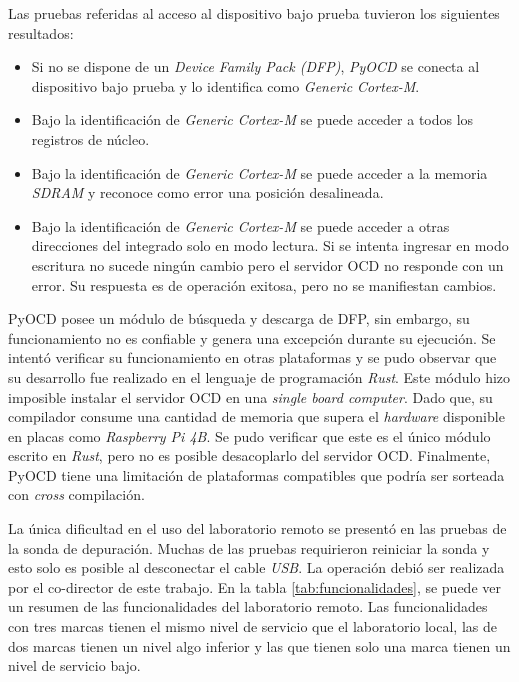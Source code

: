 Las pruebas referidas al acceso al dispositivo bajo prueba tuvieron los siguientes resultados:

\begin{itemize}
    \item Si no se dispone de un \emph{Device Family Pack (DFP)}, \emph{PyOCD} se conecta al dispositivo bajo prueba y lo identifica como \emph{Generic Cortex-M}.
    \item Bajo la identificación de \emph{Generic Cortex-M} se puede acceder a todos los registros de núcleo.
    \item Bajo la identificación de \emph{Generic Cortex-M} se puede acceder a la memoria \emph{SDRAM} y reconoce como error una posición desalineada.
    \item Bajo la identificación de \emph{Generic Cortex-M} se puede acceder a otras direcciones del integrado solo en modo lectura.
        Si se intenta ingresar en modo escritura no sucede ningún cambio pero el servidor OCD no responde con un error.
        Su respuesta es de operación exitosa, pero no se manifiestan cambios.
\end{itemize}

PyOCD posee un módulo de búsqueda y descarga de DFP, sin embargo, su funcionamiento no es confiable y genera una excepción durante su ejecución.
Se intentó verificar su funcionamiento en otras plataformas y se pudo observar que su desarrollo fue realizado en el lenguaje de programación \emph{Rust}.
Este módulo hizo imposible instalar el servidor OCD en una \emph{single board computer}.
Dado que, su compilador consume una cantidad de memoria que supera el \emph{hardware} disponible en placas como \emph{Raspberry Pi 4B}.
Se pudo verificar que este es el único módulo escrito en \emph{Rust}, pero no es posible desacoplarlo del servidor OCD.
Finalmente, PyOCD tiene una limitación de plataformas compatibles que podría ser sorteada con \emph{cross} compilación.

La única dificultad en el uso del laboratorio remoto se presentó en las pruebas de la sonda de depuración.
Muchas de las pruebas requirieron reiniciar la sonda y esto solo es posible al desconectar el cable \emph{USB}.
La operación debió ser realizada por el co-director de este trabajo.
En la tabla \ref{tab:funcionalidades}, se puede ver un resumen de las funcionalidades del laboratorio remoto.
Las funcionalidades con tres marcas tienen el mismo nivel de servicio que el laboratorio local, las de dos marcas tienen un nivel algo inferior y las que tienen solo una marca tienen un nivel de servicio bajo.

